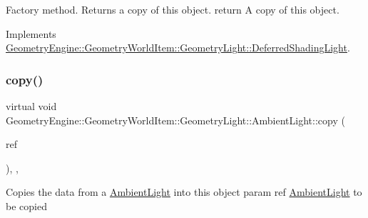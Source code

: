 Factory method. Returns a copy of this object. return A copy of this object. 

Implements \mbox{\hyperlink{class_geometry_engine_1_1_geometry_world_item_1_1_geometry_light_1_1_deferred_shading_light_a7ef4d7b7a41cbda01a55bcb0475484d3}{Geometry\+Engine\+::\+Geometry\+World\+Item\+::\+Geometry\+Light\+::\+Deferred\+Shading\+Light}}.

\mbox{\label{class_geometry_engine_1_1_geometry_world_item_1_1_geometry_light_1_1_ambient_light_a1c70ea9fb43e4242ef93ffd154304988}} 
\subsubsection{\texorpdfstring{copy()}{copy()}}
{\footnotesize\ttfamily virtual void Geometry\+Engine\+::\+Geometry\+World\+Item\+::\+Geometry\+Light\+::\+Ambient\+Light\+::copy (\begin{DoxyParamCaption}\item[{const \mbox{\hyperlink{class_geometry_engine_1_1_geometry_world_item_1_1_geometry_light_1_1_ambient_light}{Ambient\+Light}} \&}]{ref }\end{DoxyParamCaption})\hspace{0.3cm}{\ttfamily [inline]}, {\ttfamily [protected]}, {\ttfamily [virtual]}}

Copies the data from a \mbox{\hyperlink{class_geometry_engine_1_1_geometry_world_item_1_1_geometry_light_1_1_ambient_light}{Ambient\+Light}} into this object param ref \mbox{\hyperlink{class_geometry_engine_1_1_geometry_world_item_1_1_geometry_light_1_1_ambient_light}{Ambient\+Light}} to be copied \mbox{\label{class_geometry_engine_1_1_geometry_world_item_1_1_geometry_light_1_1_ambient_light_a37469f72317d3d9cd0e5fb46fbf5fedf}} 
